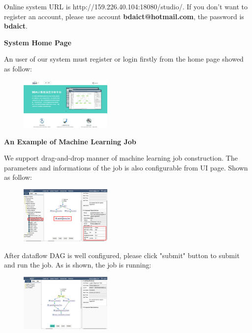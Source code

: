 \documentclass{sig-alternate-05-2015}
\begin{document}



\newpage
\appendix


Online system URL is http://159.226.40.104:18080/studio/. 
If you don't want to register an account, please use account \textbf{bdaict@hotmail.com}, the password is \textbf{bdaict}.

\noindent\textbf{System Home Page}

An user of our system must register or login firstly from the home page showed as follow:
\begin{figure}[!htb]
\centering
\includegraphics[width = 0.4\textwidth]{HomePage.eps}
\end{figure}

\noindent\textbf{An Example of Machine Learning Job}

We support drag-and-drop manner of machine learning job construction. The parameters and informations of the job is also configurable from UI page. Shown as follow:
\begin{figure}[!htb]
\centering
\includegraphics[width = 0.4\textwidth]{job_construct.eps}
\end{figure}

After dataflow DAG is well configured, please click "submit" button to submit and run the job. As is shown, the job is running:

\begin{figure}[!htb]
\centering
\includegraphics[width = 0.4\textwidth]{job_submit.eps}
\end{figure}
\end{document}
